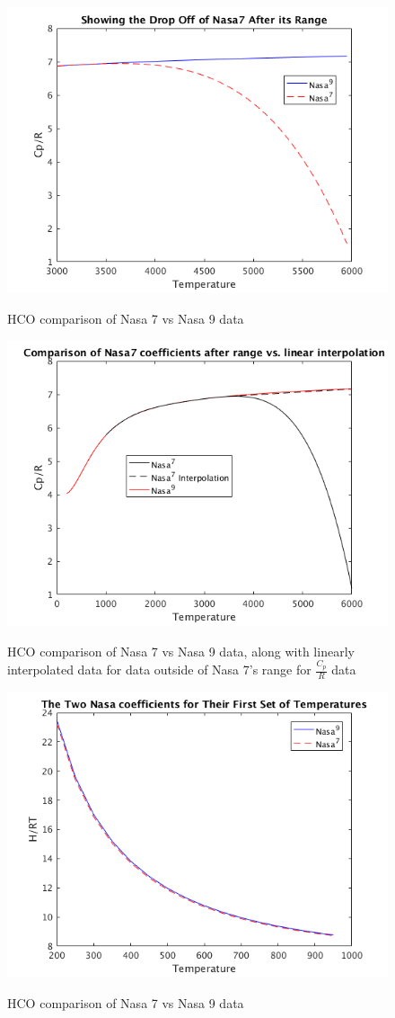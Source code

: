\documentclass{article}
\begin{document}
\begin{figure}
  \centering
  \includegraphics[width=.8\linewidth]{./NasaPlots/Cp3.png}
  \label{fig:cp3}
  \caption{HCO comparison of Nasa 7 vs Nasa 9 data}
\end{figure}

 \begin{figure}
  \centering
  \includegraphics[width=.8\linewidth]{./NasaPlots/CpT.png}
  \label{fig:cpT}
  \caption{HCO comparison of Nasa 7 vs Nasa 9 data, along with linearly interpolated data for data outside of Nasa 7's range for $\frac{C_p}{R}$ data}
\end{figure}

\begin{figure}
  \centering
  \includegraphics[width=.8\linewidth]{./NasaPlots/H1.png}
  \label{fig:H1}
  \caption{HCO comparison of Nasa 7 vs Nasa 9 data}
\end{figure}
\end{document}
